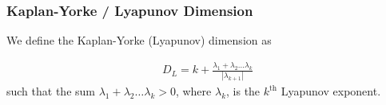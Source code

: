 \documentclass[9pt]{article}
\begin{document}




\subsubsection{Kaplan-Yorke / Lyapunov Dimension}

We define the Kaplan-Yorke (Lyapunov) dimension as 

\begin{align}
  D_{L} = k + \frac{\lambda_1 + \lambda_2 \ldots \lambda_k}{|\lambda_{k + 1}|}  
\end{align} 
such that the sum $\lambda_1 + \lambda_2 \ldots \lambda_k > 0$, where $\lambda_k$, is the $k^{\text{th}}$ Lyapunov exponent.



\newpage


\end{document}
